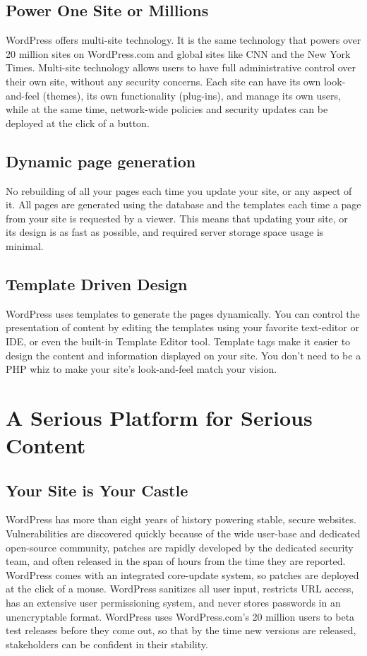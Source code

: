 \subsection{Power One Site or Millions}

WordPress offers multi-site technology. It is the same technology that powers over 20 million sites on WordPress.com and global sites like CNN and the New York Times. Multi-site technology allows users to have full administrative control over their own site, without any security concerns. Each site can have its own look-and-feel (themes), its own functionality (plug-ins), and manage its own users, while at the same time, network-wide policies and security updates can be deployed at the click of a button.

\subsection{Dynamic page generation}

No rebuilding of all your pages each time you update your site, or any aspect of it. All pages are generated using the database and the templates each time a page from your site is requested by a viewer. This means that updating your site, or its design is as fast as possible, and required server storage space usage is minimal.

\subsection{Template Driven Design}

WordPress uses templates to generate the pages dynamically. You can control the presentation of content by editing the templates using your favorite text-editor or IDE, or even the built-in Template Editor tool. Template tags make it easier to design the content and information displayed on your site. You don't need to be a PHP whiz to make your site's look-and-feel match your vision.


\section{A Serious Platform for Serious Content}

\subsection{Your Site is Your Castle}
 
WordPress has more than eight years of history powering stable, secure websites. Vulnerabilities are discovered quickly because of the wide user-base and dedicated open-source community, patches are rapidly developed by the dedicated security team, and often released in the span of hours from the time they are reported. WordPress comes with an integrated core-update system, so patches are deployed at the click of a mouse. WordPress sanitizes all user input, restricts URL access, has an extensive user permissioning system, and never stores passwords in an unencryptable format. WordPress uses WordPress.com’s 20 million users to beta test releases before they come out, so that by the time new versions are released, stakeholders can be confident in their stability.


